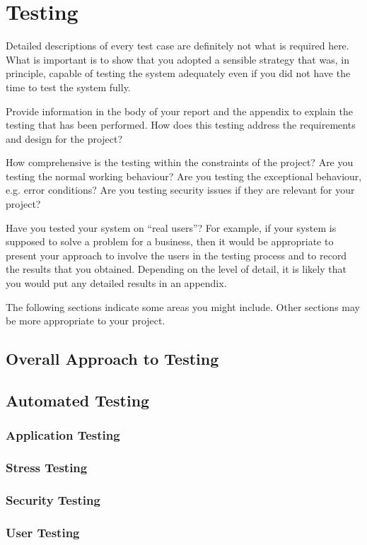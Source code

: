 \chapter{Testing}

Detailed descriptions of every test case are definitely not what is required here. What is important is to show that you adopted a sensible strategy that was, in principle, capable of testing the system adequately even if you did not have the time to test the system fully.

Provide information in the body of your report and the appendix to explain the testing that has been performed. How does this testing address the requirements and design for the project?

How comprehensive is the testing within the constraints of the project?  Are you testing the normal working behaviour? Are you testing the exceptional behaviour, e.g. error conditions? Are you testing security issues if they are relevant for your project? 

Have you tested your system on ``real users''? For example, if your system is supposed to solve a problem for a business, then it would be appropriate to present your approach to involve the users in the testing process and to record the results that you obtained. Depending on the level of detail, it is likely that you would put any detailed results in an appendix.

The following sections indicate some areas you might include. Other sections may be more appropriate to your project. 

\section{Overall Approach to Testing}

\section{Automated Testing}

\subsection{Application Testing}

\subsection{Stress Testing}

\subsection{Security Testing}

\subsection{User Testing}